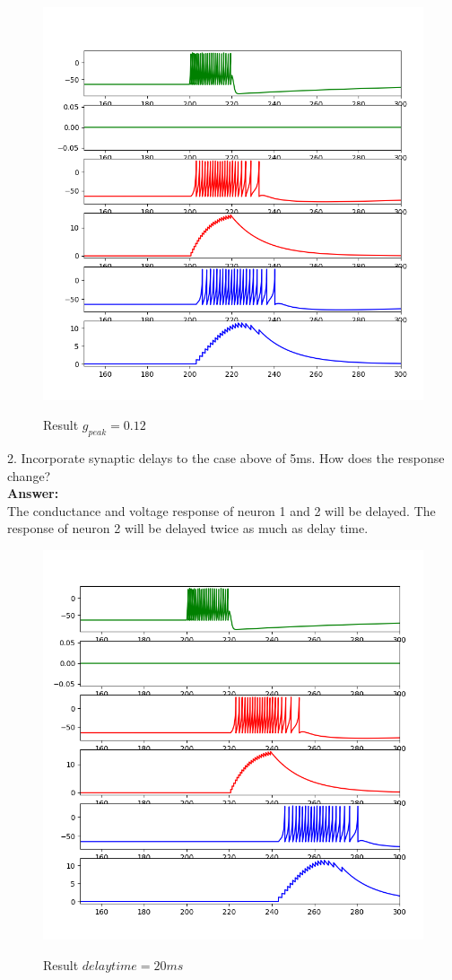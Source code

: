 \documentclass[12pt]{article}
\begin{document}
 \begin{figure}[H]
  \centering
  \includegraphics[width=.8\textwidth]{h3_p1_p1_012.png} %
  \label{img} %
  \caption{Result $g_{peak}=0.12$}
\end{figure}
\newpage

2. Incorporate synaptic delays to the case above of 5ms. How does the response change?
\\

\textbf{Answer:} 
\\

The conductance and voltage response of neuron 1 and 2 will be delayed. The response of neuron 2 will be delayed twice as much as delay time.
\begin{figure}[H]
  \centering
  \includegraphics[width=.8\textwidth]{h3_p1_p2.png} %
  \label{img} %
  \caption{Result $delay time = 20 ms$}
\end{figure}
\end{document}
